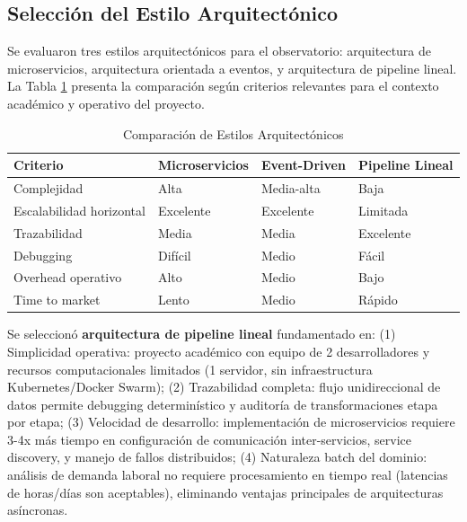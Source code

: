 \subsection{Selección del Estilo Arquitectónico}

Se evaluaron tres estilos arquitectónicos para el observatorio: arquitectura de microservicios, arquitectura orientada a eventos, y arquitectura de pipeline lineal. La Tabla \ref{tab:arch-comparison} presenta la comparación según criterios relevantes para el contexto académico y operativo del proyecto.

\begin{table}[H]
\centering
\caption{Comparación de Estilos Arquitectónicos}
\label{tab:arch-comparison}
\begin{tabular}{|p{3cm}|p{3.5cm}|p{3.5cm}|p{3.5cm}|}
\hline
\textbf{Criterio} & \textbf{Microservicios} & \textbf{Event-Driven} & \textbf{Pipeline Lineal} \\
\hline
Complejidad & Alta & Media-alta & Baja \\
\hline
Escalabilidad horizontal & Excelente & Excelente & Limitada \\
\hline
Trazabilidad & Media & Media & Excelente \\
\hline
Debugging & Difícil & Medio & Fácil \\
\hline
Overhead operativo & Alto & Medio & Bajo \\
\hline
Time to market & Lento & Medio & Rápido \\
\hline
\end{tabular}
\end{table}

Se seleccionó \textbf{arquitectura de pipeline lineal} fundamentado en: (1) Simplicidad operativa: proyecto académico con equipo de 2 desarrolladores y recursos computacionales limitados (1 servidor, sin infraestructura Kubernetes/Docker Swarm); (2) Trazabilidad completa: flujo unidireccional de datos permite debugging determinístico y auditoría de transformaciones etapa por etapa; (3) Velocidad de desarrollo: implementación de microservicios requiere 3-4x más tiempo en configuración de comunicación inter-servicios, service discovery, y manejo de fallos distribuidos; (4) Naturaleza batch del dominio: análisis de demanda laboral no requiere procesamiento en tiempo real (latencias de horas/días son aceptables), eliminando ventajas principales de arquitecturas asíncronas.


